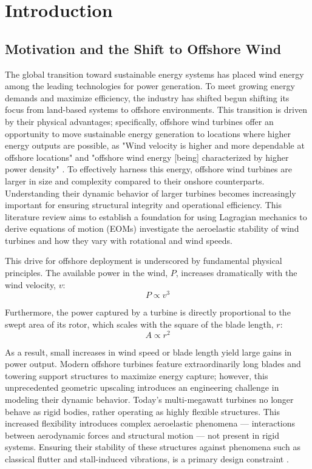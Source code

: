 \documentclass[onecolumn,draftcls]{IEEEtran}
\begin{document}
\newpage
\tableofcontents
\newpage

\section{Introduction}

\subsection{Motivation and the Shift to Offshore Wind}
The global transition toward sustainable energy systems has placed wind energy among the leading technologies for power generation. To meet growing energy demands and maximize efficiency, the industry has shifted begun shifting its focus from land-based systems to offshore environments. This transition is driven by their physical advantages; specifically, offshore wind turbines offer an opportunity to move sustainable energy generation to locations where higher energy outputs are possible, as "Wind velocity is higher and more dependable at offshore locations" and "offshore wind energy [being] characterized by higher power density" \cite{Desalegn2023onshore}. To effectively harness this energy, offshore wind turbines are larger in size and complexity compared to their onshore counterparts. Understanding their dynamic behavior of larger turbines becomes increasingly important for ensuring structural integrity and operational efficiency. This literature review aims to establish a foundation for using Lagragian mechanics to derive equations of motion (EOMs) investigate the aeroelastic stability of wind turbines and how they vary with rotational and wind speeds.

This drive for offshore deployment is underscored by fundamental physical principles. The available power in the wind, $P$, increases dramatically with the wind velocity, $v$:
\begin{equation}
    \label{eq:power_wind}
    P \propto v^{3}
\end{equation}

Furthermore, the power captured by a turbine is directly proportional to the swept area of its rotor, which scales with the square of the blade length, $r$:
\begin{equation}
    \label{eq:power_area}
    A \propto r^{2}
\end{equation}

As a result, small increases in wind speed or blade length yield large gains in power output. Modern offshore turbines feature extraordinarily long blades and towering support structures to maximize energy capture; however, this unprecedented geometric upscaling introduces an engineering challenge in modeling their dynamic behavior. Today's multi-megawatt turbines no longer behave as rigid bodies, rather operating as highly flexible structures. This increased flexibility introduces complex aeroelastic phenomena — interactions between aerodynamic forces and structural motion — not present in rigid systems. Ensuring their stability of these structures against phenomena such as classical flutter and stall-induced vibrations, is a primary design constraint \cite{hansen2007aeroelastic}.
\end{document}
